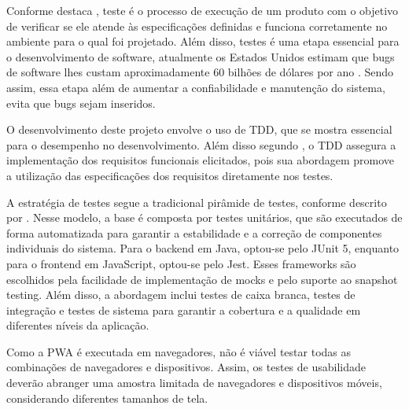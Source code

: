 
Conforme destaca , teste é o processo de execução de um produto com o objetivo de verificar se ele atende às especificações definidas e funciona corretamente no ambiente para o qual foi projetado. Além disso, testes é uma etapa essencial para o desenvolvimento de software, atualmente os Estados Unidos estimam que bugs de software lhes custam aproximadamente 60 bilhões de dólares por ano \cite{aniche_2014}. Sendo assim, essa etapa além de aumentar a confiabilidade e manutenção do sistema, evita que bugs sejam inseridos.

O desenvolvimento deste projeto envolve o uso de TDD, que se mostra essencial para o desempenho no desenvolvimento. Além disso segundo , o TDD assegura a implementação dos requisitos funcionais elicitados, pois sua abordagem promove a utilização das especificações dos requisitos diretamente nos testes.

A estratégia de testes segue a tradicional pirâmide de testes, conforme descrito por . Nesse modelo, a base é composta por testes unitários, que são executados de forma automatizada para garantir a estabilidade e a correção de componentes individuais do sistema. Para o backend em Java, optou-se pelo JUnit 5, enquanto para o frontend em JavaScript, optou-se pelo Jest. Esses frameworks são escolhidos pela facilidade de implementação de mocks e pelo suporte ao snapshot testing. Além disso, a abordagem inclui testes de caixa branca, testes de integração e testes de sistema para garantir a cobertura e a qualidade em diferentes níveis da aplicação.

Como a PWA é executada em navegadores, não é viável testar todas as combinações de navegadores e dispositivos. Assim, os testes de usabilidade deverão abranger uma amostra limitada de navegadores e dispositivos móveis, considerando diferentes tamanhos de tela.


